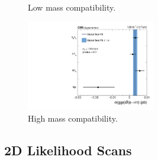 \begin{figure}[!hbtp]
\centering
\caption{Low mass compatibility.}
\label{fig:low_mass_compatibility}
\end{figure}

\begin{figure}[!hbtp]
\centering
    \includegraphics[width=0.5\textwidth]{Figures/ccc_fit_result_mH1200_per-channel.pdf}
\caption{High mass compatibility.}
\label{fig:high_mass_compatibility}
\end{figure}

\subsection{2D Likelihood Scans}

